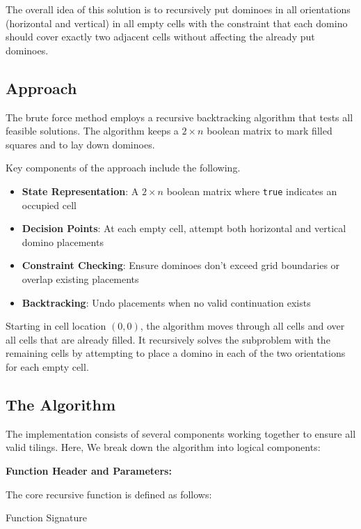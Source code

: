 \documentclass[conference]{IEEEtran}
\begin{document}
The overall idea of this solution is to recursively put dominoes in all orientations (horizontal and vertical) in all empty cells with the constraint that each domino should cover exactly two adjacent cells without affecting the already put dominoes.

\subsection{Approach}

The brute force method employs a recursive backtracking algorithm that tests all feasible solutions. The algorithm keeps a $2 \times n$ boolean matrix to mark filled squares and to lay down dominoes.

Key components of the approach include the following.

\begin{itemize}
    \item \textbf{State Representation}: A $2 \times n$ boolean matrix where \texttt{true} indicates an occupied cell
    \item \textbf{Decision Points}: At each empty cell, attempt both horizontal and vertical domino placements
    \item \textbf{Constraint Checking}: Ensure dominoes don't exceed grid boundaries or overlap existing placements
    \item \textbf{Backtracking}: Undo placements when no valid continuation exists
\end{itemize}

Starting in cell location $(0,0)$, the algorithm moves through all cells and over all cells that are already filled. It recursively solves the subproblem with the remaining cells by attempting to place a domino in each of the two orientations for each empty cell.

\subsection{The Algorithm}

The implementation consists of several components working together to ensure all valid tilings. Here, We break down the algorithm into logical components:

\textbf{Function Header and Parameters:}

The core recursive function is defined as follows:

\begin{algorithm}[htbp]
\caption{Function Signature}
\begin{algorithmic}[1]
\EndProcedure
\end{algorithmic}
\end{algorithm}
\end{document}
